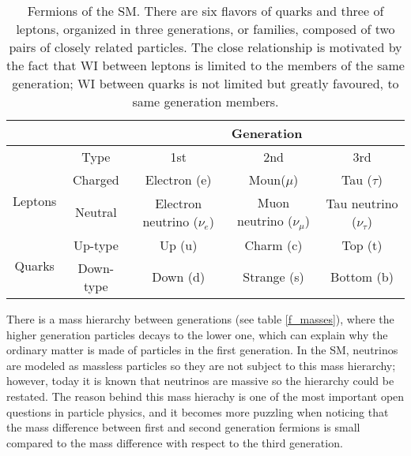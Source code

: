 \begin{center}
\begin{table}[h!]
\centering
\footnotesize
\begin{tabular}{ccccc} \hline
                         &         & \multicolumn{3}{c}{Generation}                                                           \\ \hline
                         &Type     & 1st                          & 2nd                        & 3rd                          \\ \hline
\multirow{2}{*}{Leptons} &Charged  & Electron (e)                 & Moun($\mu$)                & Tau ($\tau$)                 \\%
                         &Neutral  & Electron neutrino ($\nu_e$)  & Muon neutrino ($\nu_{\mu}$) & Tau neutrino ($\nu_{\tau}$) \\\hline
\multirow{2}{*}{Quarks}  &Up-type  & Up (u)                       & Charm (c)                & Top (t)                        \\%
                         &Down-type& Down (d)                     & Strange (s)              & Bottom (b)                     \\\hline
\end{tabular}
\caption[Fermions of the SM.]{Fermions of the SM. There are six flavors of quarks and three of leptons, organized in three generations, or families, composed of two pairs of closely related particles. The close relationship is motivated by the fact that WI between leptons is limited to the members of the same generation; WI between quarks is not limited but greatly favoured, to same generation members. }\label{flav_gen}
\end{table}
\end{center}
\noindent There is a mass hierarchy between generations (see table \ref{f_masses}), where the higher generation particles decays to the lower one, which can explain why the ordinary matter is made of particles in the first generation. In the SM, neutrinos are modeled as massless particles so they are not subject to this mass hierarchy; however, today it is known that neutrinos are massive so the hierarchy could be restated. The reason behind this mass hierachy is one of the most important open questions in particle physics, and it becomes more puzzling when noticing that the mass difference between first and second generation fermions is small compared to the mass difference with respect to the third generation.
